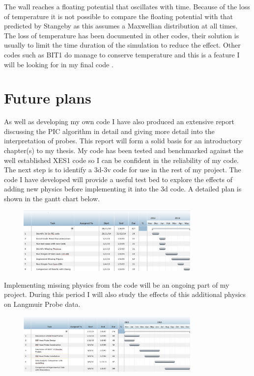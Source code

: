 \documentclass[12pt]{article}
\begin{document}
The wall reaches a floating potential that oscillates with time. Because of the loss of temperature it is not possible to compare the floating potential with that predicted by Stangeby \cite{stangeby-2000} as this assumes a Maxwellian distribution at all times. The loss of temperature has been documented in other codes, their solution is usually to limit the time duration of the simulation to reduce the effect. Other codes such as BIT1 do manage to conserve temperature and this is a feature I will be looking for in my final code \cite{BIT1}. 



\section{Future plans}
As well as developing my own code I have also produced an extensive report discussing the PIC algorithm in detail and giving more detail into the interpretation of probes. This report will form a solid basis for an introductory chapter(s) to my thesis. My code has been tested and benchmarked against the well established XES1 code so I can be confident in the reliability of my code. The next step is to identify a 3d-3v code for use in the rest of my project. The code I have developed will provide a useful test bed to explore the effects of adding new physics before implementing it into the 3d code. A detailed plan is shown in the gantt chart below.

\begin{figure}[H]
\centering
\includegraphics[width=0.8\textwidth]{plan1}
\end{figure}
Implementing missing physics from the code will be an ongoing part of my project. During this period I will also study the effects of this additional physics on Langmuir Probe data. 


\begin{figure}[H]
\centering
\includegraphics[width=0.8\textwidth]{plan2}
\end{figure}
\end{document}
